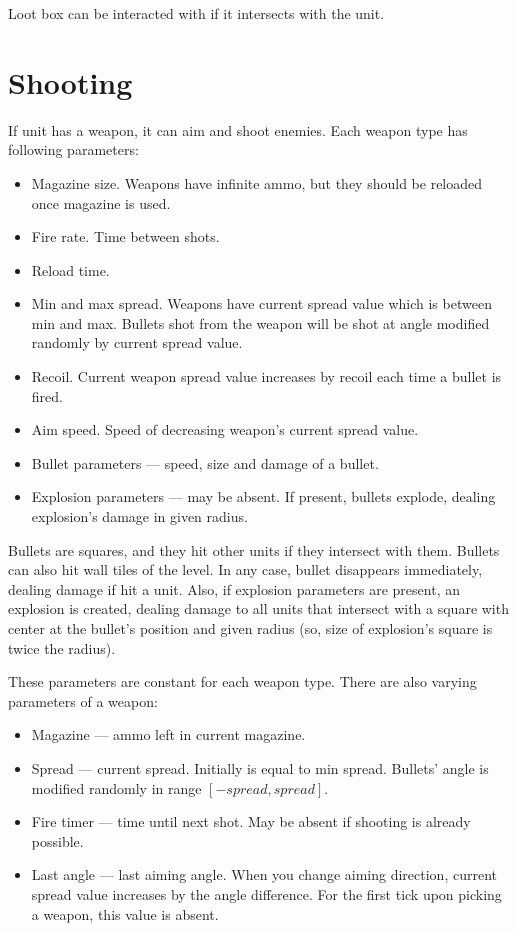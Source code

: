 Loot box can be interacted with if it intersects with the unit.

\section{Shooting}

If unit has a weapon, it can aim and shoot enemies. Each weapon type has following parameters:
\begin{itemize}
      \item Magazine size. Weapons have infinite ammo, but they should be reloaded once magazine is used.
      \item Fire rate. Time between shots.
      \item Reload time.
      \item Min and max spread. Weapons have current spread value which is between min and max.
            Bullets shot from the weapon will be shot at angle modified randomly by current spread value.
      \item Recoil. Current weapon spread value increases by recoil each time a bullet is fired.
      \item Aim speed. Speed of decreasing weapon's current spread value.
      \item Bullet parameters --- speed, size and damage of a bullet.
      \item Explosion parameters --- may be absent.
            If present, bullets explode, dealing explosion's damage in given radius.
\end{itemize}

Bullets are squares, and they hit other units if they intersect with them.
Bullets can also hit wall tiles of the level.
In any case, bullet disappears immediately, dealing damage if hit a unit.
Also, if explosion parameters are present, an explosion is created,
dealing damage to all units that intersect with a square with center at the bullet's position and given radius
(so, size of explosion's square is twice the radius).

These parameters are constant for each weapon type. There are also varying parameters of a weapon:
\begin{itemize}
      \item Magazine --- ammo left in current magazine.
      \item Spread --- current spread. Initially is equal to min spread.
            Bullets' angle is modified randomly in range $[-spread, spread]$.
      \item Fire timer --- time until next shot. May be absent if shooting is already possible.
      \item Last angle --- last aiming angle. When you change aiming direction,
            current spread value increases by the angle difference.
            For the first tick upon picking a weapon, this value is absent.
\end{itemize}

